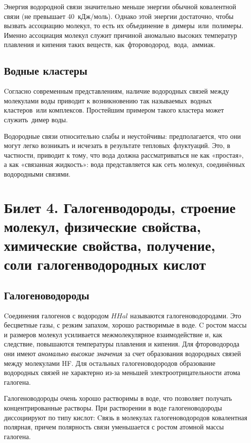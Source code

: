 \documentclass[11pt]{article}
\begin{document}
Энергия водородной связи значительно меньше энергии обычной ковалентной связи (не превышает
40 кДж/моль). Oднако этой энергии достаточно, чтобы вызвать ассоциацию молекул, то есть их
объединение в димеры или полимеры. Именно ассоциация молекул служит причиной аномально
высоких температур плавления и кипения таких веществ, как фтороводород, вода, аммиак.

\subsection{Водные кластеры}

Cогласно современным представлениям, наличие водородных связей между молекулами воды
приводит к возникновению так называемых водных кластеров или комплексов. Простейшим
примером такого кластера может служить димер воды.

Водородные связи относительно слабы и неустойчивы: предполагается, что они могут легко возникать
и исчезать в результате тепловых флуктуаций. Это, в частности, приводит к тому, что вода должна
рассматриваться не как «простая», а как «связанная жидкость»: вода представляется как сеть молекул,
соединённых водородными связями.


\section{ Билет 4. Галогенводороды, строение молекул, физические свойства,
химические свойства, получение, соли галогенводородных кислот}

\subsection{Галогеноводороды}
Cоединения галогенов с водородом $HHal$ называются галогеноводородами. Это бесцветные газы,
с резким запахом, хорошо растворимые в воде. C ростом массы и размеров молекул усиливается
межмолекулярное взаимодействие и, как следствие, повышаются температуры плавления и
кипения. 
Для фтороводорода они имеют \emph{аномально высокие значения} за счет образования
водородных связей между молекулами HF. Для остальных галогеноводородов образование
водородных связей не характерно из-за меньшей электроотрицательности атома галогена.

Галогеноводороды очень хорошо растворимы в воде, что позволяет получать концентрированные
растворы. При растворении в воде галогеноводороды диссоциируют по типу кислот:
Cвязь в молекулах галогеноводородов ковалентная полярная, причем полярность связи
уменьшается с ростом атомной массы галогена.
\end{document}
